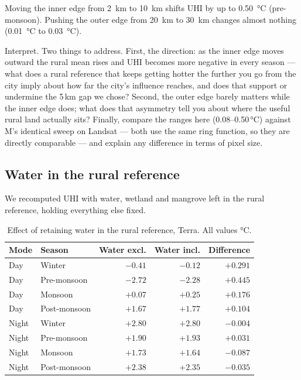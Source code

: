 \documentclass[11pt,a4paper]{article}
\newcommand\TODO{}
\begin{document}
Moving the inner edge from \SI{2}{\kilo\metre} to
\SI{10}{\kilo\metre} shifts UHI by up to
\SI{0.50}{\degreeCelsius} (pre-monsoon). Pushing the outer edge from
\SI{20}{\kilo\metre} to \SI{30}{\kilo\metre} changes almost nothing
(\SI{0.01}{\degreeCelsius} to \SI{0.03}{\degreeCelsius}).

\TODO{Interpret. Two things to address. First, the direction: as the
inner edge moves outward the rural mean rises and UHI becomes more
negative in every season --- what does a rural reference that keeps
getting hotter the further you go from the city imply about how far
the city's influence reaches, and does that support or undermine the
5\,km gap we chose? Second, the outer edge barely matters while the
inner edge does; what does that asymmetry tell you about where the
useful rural land actually sits? Finally, compare the ranges here
(0.08--0.50\,\si{\degreeCelsius}) against M's identical sweep on
Landsat --- both use the same ring function, so they are directly
comparable --- and explain any difference in terms of pixel size.}

\subsection{Water in the rural reference}
\label{sec:watertest}

We recomputed UHI with water, wetland and mangrove left in the rural
reference, holding everything else fixed.

\begin{table}[htbp]
\centering
\small
\begin{tabular}{llrrr}
\toprule
\textbf{Mode} & \textbf{Season} & \textbf{Water excl.} &
\textbf{Water incl.} & \textbf{Difference} \\
\midrule
Day   & Winter       & $-0.41$ & $-0.12$ & $+0.291$ \\
Day   & Pre-monsoon  & $-2.72$ & $-2.28$ & $+0.445$ \\
Day   & Monsoon      & $+0.07$ & $+0.25$ & $+0.176$ \\
Day   & Post-monsoon & $+1.67$ & $+1.77$ & $+0.104$ \\
\midrule
Night & Winter       & $+2.80$ & $+2.80$ & $-0.004$ \\
Night & Pre-monsoon  & $+1.90$ & $+1.93$ & $+0.031$ \\
Night & Monsoon      & $+1.73$ & $+1.64$ & $-0.087$ \\
Night & Post-monsoon & $+2.38$ & $+2.35$ & $-0.035$ \\
\bottomrule
\end{tabular}
\caption{Effect of retaining water in the rural reference, Terra.
All values \si{\degreeCelsius}.}
\label{tab:watertest}
\end{table}
\end{document}
